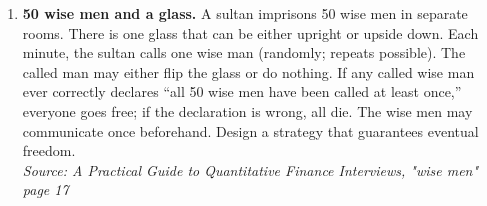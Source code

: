 \documentclass[11pt]{article}
\begin{document}
\begin{enumerate}[label=\textbf{\arabic*.}, resume]
\item \textbf{50 wise men and a glass.} A sultan imprisons 50 wise men in separate rooms. There is one glass that can be either upright or upside down. Each minute, the sultan calls one wise man (randomly; repeats possible). The called man may either flip the glass or do nothing. If any called wise man ever correctly declares ``all 50 wise men have been called at least once,'' everyone goes free; if the declaration is wrong, all die. The wise men may communicate once beforehand. Design a strategy that guarantees eventual freedom.\\
\hfill{\small\textit{Source: A Practical Guide to Quantitative Finance Interviews, "wise men" page 17}}
\end{enumerate}
\end{document}
